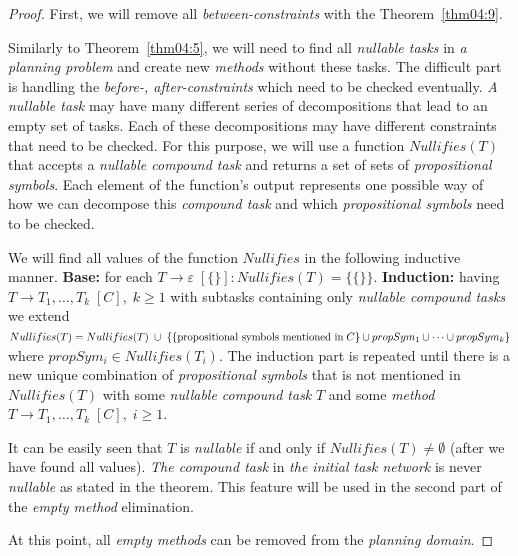 \begin{proof}
    First, we will remove all \emph{between-constraints} with the Theorem~\ref{thm04:9}.

    Similarly to Theorem~\ref{thm04:5}, we will need to find all \emph{nullable tasks} in \emph{a planning problem} and create new \emph{methods} without these tasks. The difficult part is handling the \emph{before-, after-constraints} which need to be checked eventually. \emph{A nullable task} may have many different series of decompositions that lead to an empty set of tasks. Each of these decompositions may have different constraints that need to be checked. For this purpose, we will use a function $Nullifies(T)$ that accepts a \emph{nullable compound task} and returns a set of sets of \emph{propositional symbols}. Each element of the function's output represents one possible way of how we can decompose this \emph{compound task} and which \emph{propositional symbols} need to be checked.

    We will find all values of the function $Nullifies$ in the following inductive manner. \textbf{Base:} for each $T \rightarrow \varepsilon \; [\{\}]: Nullifies(T) = \{\{\}\}$. \textbf{Induction:} having $T \rightarrow T_1, \dots, T_k \; [C], \; k \geq 1$ with subtasks containing only \emph{nullable compound tasks} we extend $Nullifies(T) = Nullifies(T) \; \cup \; \{\{\text{propositional symbols mentioned in} \; C\} \\ \cup propSym_1 \cup \dots \cup propSym_k\}$ where $propSym_i \in Nullifies(T_i)$. The induction part is repeated until there is a new unique combination of \emph{propositional symbols} that is not mentioned in $Nullifies(T)$ with some \emph{nullable compound task} $T$ and some \emph{method} $T \rightarrow T_1, \dots, T_k \; [C], \; i \geq 1$.

    It can be easily seen that $T$ is \emph{nullable} if and only if $Nullifies(T) \neq \emptyset$ (after we have found all values). \emph{The compound task} in \emph{the initial task network} is never \emph{nullable} as stated in the theorem. This feature will be used in the second part of the \emph{empty method} elimination.

    At this point, all \emph{empty methods} can be removed from the \emph{planning domain}.


\end{proof}
